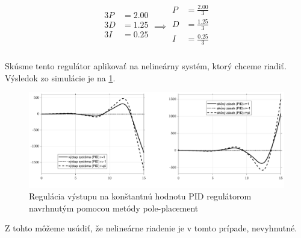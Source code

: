 	\begin{equation}
	\begin{aligned}
		\begin{matrix}
		3P &= 2.00 \\
		3D &= 1.25 \\ 
		3I &= 0.25 \\
		\end{matrix}
		\implies 
		\begin{matrix}
		P &= \frac{2.00}{3} \\
		D &= \frac{1.25}{3} \\ 
		I &= \frac{0.25}{3}  \\
		\end{matrix}
	\end{aligned}
	\label{eqn:svlvvPr1RovniceParametrovPID}
	\end{equation}
	
	Skúsme tento regulátor aplikovať na nelineárny systém, ktorý chceme riadiť. Výsledok zo simulácie je na \cref{fig:svlvPr1VysledokPID}.
	
		\begin{figure}[h!]
			\centering
		\includegraphics[width=\linewidth]{./figures/svlvvPr1PIDVysledok-crop}
		\caption{Regulácia výstupu na konštantnú hodnotu PID regulátorom navrhnutým pomocou metódy pole-placement}
		\label{fig:svlvPr1VysledokPID}
	\end{figure}
	
	Z tohto môžeme usúdiť, že nelineárne riadenie je v tomto prípade, nevyhnutné.
	

